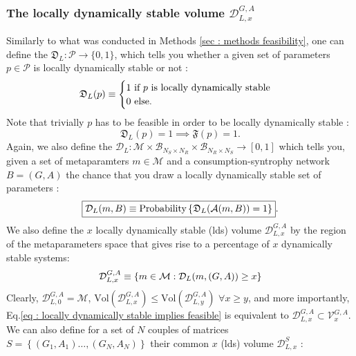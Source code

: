 \documentclass[12pt, titlepage]{report}
\begin{document}
\subsubsection{The locally dynamically stable volume $\mathcal{D}^{G,A}_{L,x}$}
Similarly to what was conducted in Methods \ref{sec : methods feasibility}, one can define the  $\mathfrak{D}_L : \mathcal{P} \rightarrow \{
0,1\}$, which tells you whether a given set of parameters $p \in \mathcal{P}$ is locally dynamically stable or not :
\begin{equation}
\mathfrak{D}_L(p)\equiv\begin{cases}
1 \text{ if } p \text{ is locally dynamically stable} \\
0 \text{ else.}
\end{cases}
\end{equation}
Note that trivially $p$ has to be feasible in order to be locally dynamically stable :
\begin{equation}
\mathfrak{D}_L(p)=1 \implies \mathfrak{F}(p)=1. \label{eq : locally dynamically stable implies feasible}
\end{equation}
Again, we also define the  $\mathcal{D}_L : \mathcal{M} \times \mathcal{B}_{N_S \times N_R} \times \mathcal{B}_{N_R \times N_S} \rightarrow [0,1]$ which tells you, given a set of metaparamters $m \in \mathcal{M}$ and a consumption-syntrophy network $B=(G,A)$ the chance that you draw a locally dynamically stable set of parameters :
\begin{equation}
\boxed{\mathcal{D}_L(m, B)\equiv\text{Probability}\left\{\mathfrak{D}_L(\mathcal{A}(m, B))=1\right\}}.
\end{equation}
We also define the $x$ locally dynamically stable (lds) volume $\mathcal{D}_{L,x}^{G,A}$ by the region of the metaparameters space that gives rise to a percentage of $x$ dynamically stable systems:
\begin{equation}
\mathcal{D}_{L,x}^{G,A} \equiv \left\{m \in \mathcal{M} : \mathcal{D}_L(m, (G,A)) \geq x \right\}
\end{equation}
Clearly, $\mathcal{D}_{L,0}^{G,A}=\mathcal{M}$, $\text{Vol}\left(\mathcal{D}_{L,x}^{G,A}\right) \leq \text{Vol}\left(\mathcal{D}_{L,y}^{G,A}\right)$ $\forall x \geq y$, and more importantly, Eq.\eqref{eq : locally dynamically stable implies feasible} is equivalent to $\mathcal{D}_{L,x}^{G,A} \subset \mathcal{V}_x^{G,A}$. We can also define for a set of $N$ couples of matrices $S=\left\{(G_1, A_1) \dots, (G_N, A_N)\right\}$ their common $x$ (lds) volume $\mathcal{D}_{L,x}^S$ :
\end{document}
